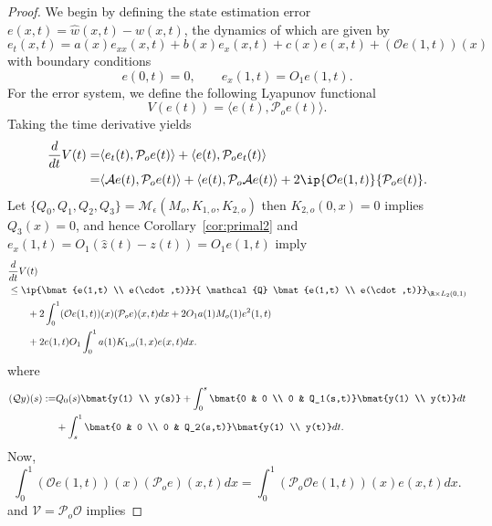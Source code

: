 \documentclass[9pt,journal,twocolumn]{IEEEtran}
\newcommand{\igzo}{\int_0^1}
\newcommand{\igzs}{\int_0^s}
\newcommand{\igso}{\int_s^1}
\newcommand{\wh}{\hat{w}}
\newcommand{\lt}{L_2(0,1)}
\begin{document}
\begin{proof}
We begin by defining the state estimation error $e(x,t)=\wh(x,t)-w(x,t)$, the dynamics of which are given by
 \begin{equation}
 \label{obs_error_eqn}
 e_t(x,t)=a(x)e_{xx}(x,t)+b(x)e_x(x,t)+c(x)e(x,t)+(\mathcal{O}e(1,t))(x)
\end{equation} with boundary conditions
\begin{equation}
 \label{obs_error_eqn_BCs}
 e(0,t)=0, \qquad e_x(1,t) = O_1 e(1,t).
\end{equation}
For the error system, we define the following Lyapunov functional
\[
V(e(t))= \langle e(t),\mathcal{P}_o e(t) \rangle.
\]
Taking the time derivative yields
 \begin{align*}
\frac{d}{dt}V(t)=& \langle e_t(t),\mathcal{P}_o e(t) \rangle + \langle e(t),\mathcal{P}_o e_t(t) \rangle \\
=& \langle \mathcal{A} e(t),\mathcal{P}_o e(t) \rangle + \langle e(t),\mathcal{P}_o\mathcal{A}e(t) \rangle + 2 \ip{\mathcal{O}e(1,t)}{\mathcal{P}_o e(t)}.
\end{align*}
Let $\{Q_0,Q_1,Q_2,Q_3\}=\mathcal{M}_\epsilon(M_o,K_{1,o},K_{2,o})$ then $K_{2,o}(0,x)=0$ implies $Q_3(x)=0$, and hence Corollary~\ref{cor:primal2} and $e_x(1,t)=O_1(\hat z(t)-z(t))=O_1 e(1,t)$ imply
 \begin{align}
 &\frac{d}{dt}V(t) \nonumber \\
 & \leq   \ip{\bmat{e(1,t) \\ e(\cdot,t)}}{ \mathcal{Q} \bmat{e(1,t) \\ e(\cdot,t)}}_{\R \times \lt} \nonumber \\
 & \qquad + 2 \igzo (\mathcal{O}e(1,t))(x) (\mathcal{P}_o e)(x,t)dx + 2 O_1 a(1)M_o(1)e^2(1,t) \nonumber \\
 &\label{eqn:Vdot_obs1}\qquad +  2e(1,t) O_1 \igzo a(1)K_{1,o}(1,x) e(x,t)dx .
 \end{align}
 where
\begin{align*}
(\mathcal{Q}y)(s) := &Q_0(s)\bmat{y(1) \\ y(s)} +   \igzs  \bmat{0 & 0 \\ 0 & Q_1(s,t)} \bmat{y(1) \\ y(t)} dt \\
&+ \igso  \bmat{0 & 0 \\ 0 & Q_2(s,t)} \bmat{y(1) \\ y(t)} dt.
\end{align*}
Now,
 \[
 \igzo (\mathcal{O}e(1,t))(x) (\mathcal{P}_oe)(x,t)dx = \igzo (\mathcal{P}_o \mathcal{O}e(1,t))(x) e(x,t)dx.
 \]
and  $\mathcal{V}=\mathcal{P}_o\mathcal{O}$ implies


\end{proof}
\end{document}
